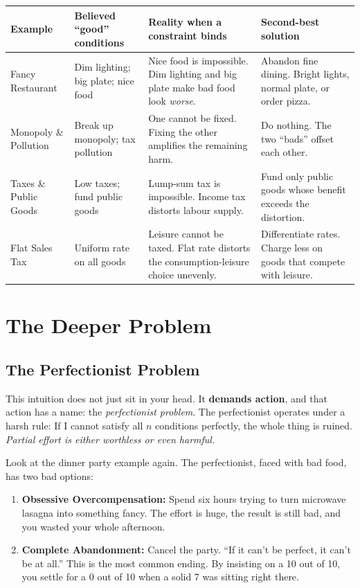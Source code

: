 \documentclass[11pt]{article}
\begin{document}
\begin{center}
\small
\begin{tabularx}{\textwidth}{|l|X|X|X|}
\hline
\textbf{Example} & \textbf{Believed ``good'' conditions} & \textbf{Reality when a constraint binds} & \textbf{Second-best solution} \\
\hline
Fancy Restaurant & Dim lighting; big plate; nice food & Nice food is impossible. Dim lighting and big plate make bad food look \textit{worse}. & Abandon fine dining. Bright lights, normal plate, or order pizza. \\
\hline
Monopoly \& Pollution & Break up monopoly; tax pollution & One cannot be fixed. Fixing the other amplifies the remaining harm. & Do nothing. The two ``bads'' offset each other. \\
\hline
Taxes \& Public Goods & Low taxes; fund public goods & Lump-sum tax is impossible. Income tax distorts labour supply. & Fund only public goods whose benefit exceeds the distortion. \\
\hline
Flat Sales Tax & Uniform rate on all goods & Leisure cannot be taxed. Flat rate distorts the consumption-leisure choice unevenly. & Differentiate rates. Charge less on goods that compete with leisure. \\
\hline
\end{tabularx}
\end{center}

\section{The Deeper Problem}

\subsection{The Perfectionist Problem}

This intuition does not just sit in your head. It \textbf{demands action}, and that action has a name: the \textit{perfectionist problem}. The perfectionist operates under a harsh rule: If I cannot satisfy all \(n\) conditions perfectly, the whole thing is ruined. \textit{Partial effort is either worthless or even harmful.}

Look at the dinner party example again. The perfectionist, faced with bad food, has two bad options:
\begin{enumerate}
    \item \textbf{Obsessive Overcompensation:} Spend six hours trying to turn microwave lasagna into something fancy. The effort is huge, the result is still bad, and you wasted your whole afternoon.
    \item \textbf{Complete Abandonment:} Cancel the party. ``If it can't be perfect, it can't be at all.'' This is the most common ending. By insisting on a 10 out of 10, you settle for a 0 out of 10 when a solid 7 was sitting right there.
\end{enumerate}
\end{document}

